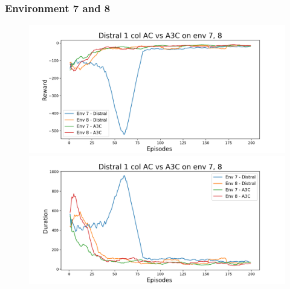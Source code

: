 \documentclass[12pt]{report}
\begin{document}
\subsubsection{Environment 7 and 8}
\begin{figure}[H]
\centering
\begin{minipage}{.5\textwidth}
\centering
\includegraphics[width=\textwidth]{figs/d1_col_ac/d1_col_ac_7_8_rwd.png}
\end{minipage}%
\centering
\begin{minipage}{.5\textwidth}
\centering
\includegraphics[width=\textwidth]{figs/d1_col_ac/d1_col_ac_7_8_dur.png}
\end{minipage}%
\end{figure}
\end{document}
